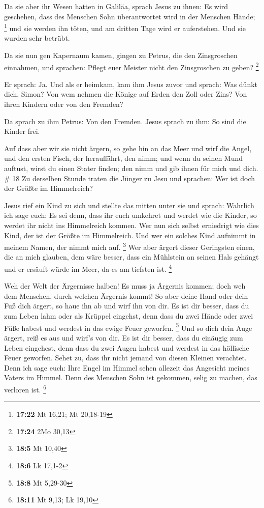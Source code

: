  Da sie aber ihr Wesen hatten in Galiläa, sprach Jesus zu
ihnen: Es wird geschehen, dass des Menschen Sohn überantwortet wird in
der Menschen Hände; \footnote{\textbf{17:22} Mt 16,21; Mt 20,18-19}
 und sie werden ihn töten, und am dritten Tage wird er
auferstehen. Und sie wurden sehr betrübt.

 Da sie nun gen Kapernaum kamen, gingen zu Petrus, die den
Zinsgroschen einnahmen, und sprachen: Pflegt euer Meister nicht den
Zinsgroschen zu geben? \footnote{\textbf{17:24} 2Mo 30,13}

 Er sprach: Ja. Und als er heimkam, kam ihm Jesus zuvor und
sprach: Was dünkt dich, Simon? Von wem nehmen die Könige auf Erden den
Zoll oder Zins? Von ihren Kindern oder von den Fremden?

 Da sprach zu ihm Petrus: Von den Fremden. Jesus sprach zu
ihm: So sind die Kinder frei.

 Auf dass aber wir sie nicht ärgern, so gehe hin an das
Meer und wirf die Angel, und den ersten Fisch, der herauffährt, den
nimm; und wenn du seinen Mund auftust, wirst du einen Stater finden; den
nimm und gib ihnen für mich und dich. \# 18  Zu derselben
Stunde traten die Jünger zu Jesu und sprachen: Wer ist doch der Größte
im Himmelreich?

 Jesus rief ein Kind zu sich und stellte das mitten unter
sie  und sprach: Wahrlich ich sage euch: Es sei denn, dass
ihr euch umkehret und werdet wie die Kinder, so werdet ihr nicht ins
Himmelreich kommen.  Wer nun sich selbst erniedrigt wie dies
Kind, der ist der Größte im Himmelreich.  Und wer ein
solches Kind aufnimmt in meinem Namen, der nimmt mich auf. \footnote{\textbf{18:5}
  Mt 10,40}  Wer aber ärgert dieser Geringsten einen, die an
mich glauben, dem wäre besser, dass ein Mühlstein an seinen Hals gehängt
und er ersäuft würde im Meer, da es am tiefsten ist. \footnote{\textbf{18:6}
  Lk 17,1-2}

 Weh der Welt der Ärgernisse halben! Es muss ja Ärgernis
kommen; doch weh dem Menschen, durch welchen Ärgernis kommt!
 So aber deine Hand oder dein Fuß dich ärgert, so haue ihn
ab und wirf ihn von dir. Es ist dir besser, dass du zum Leben lahm oder
als Krüppel eingehst, denn dass du zwei Hände oder zwei Füße habest und
werdest in das ewige Feuer geworfen. \footnote{\textbf{18:8} Mt 5,29-30}
 Und so dich dein Auge ärgert, reiß es aus und wirf's von
dir. Es ist dir besser, dass du einäugig zum Leben eingehest, denn dass
du zwei Augen habest und werdest in das höllische Feuer geworfen.
 Sehet zu, dass ihr nicht jemand von diesen Kleinen
verachtet. Denn ich sage euch: Ihre Engel im Himmel sehen allezeit das
Angesicht meines Vaters im Himmel.  Denn des Menschen Sohn
ist gekommen, selig zu machen, das verloren ist. \footnote{\textbf{18:11}
  Mt 9,13; Lk 19,10}

